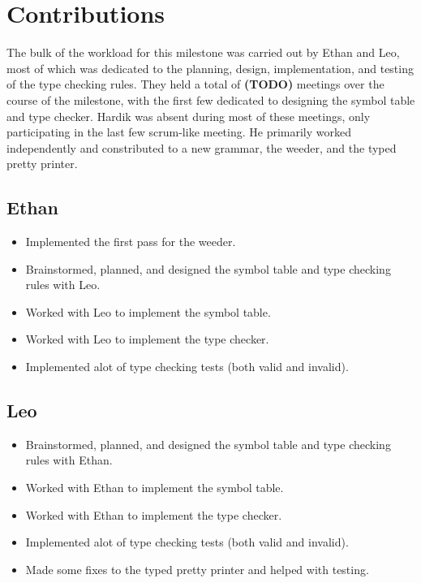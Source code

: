 \documentclass{article}
\begin{document}
\section*{Contributions}

The bulk of the workload for this milestone was carried out by Ethan and Leo, most of which was dedicated to the planning, design, implementation, and testing of the type checking rules.
They held a total of \textbf{(TODO)} meetings over the course of the milestone, with the first few dedicated to designing the symbol table and type checker.
Hardik was absent during most of these meetings, only participating in the last few scrum-like meeting.
He primarily worked independently and constributed to a new grammar, the weeder, and the typed pretty printer.

\subsection*{Ethan}

\begin{itemize}
    \item Implemented the first pass for the weeder.
    \item Brainstormed, planned, and designed the symbol table and type checking rules with Leo.
    \item Worked with Leo to implement the symbol table.
    \item Worked with Leo to implement the type checker.
    \item Implemented alot of type checking tests (both valid and invalid).
\end{itemize}

\subsection*{Leo}

\begin{itemize}
    \item Brainstormed, planned, and designed the symbol table and type checking rules with Ethan.
    \item Worked with Ethan to implement the symbol table.
    \item Worked with Ethan to implement the type checker.
    \item Implemented alot of type checking tests (both valid and invalid).
    \item Made some fixes to the typed pretty printer and helped with testing.
\end{itemize}
\end{document}
